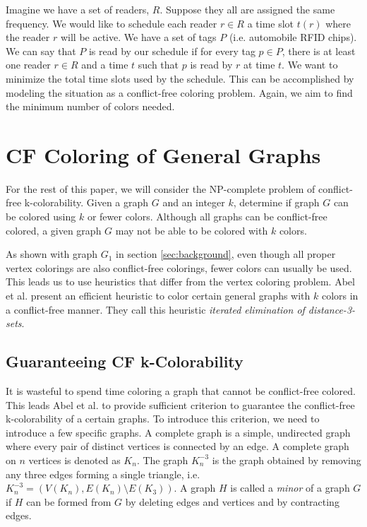 \documentclass{sig-alternate}
\begin{document}
Imagine we have a set of readers, $R$. Suppose they all are assigned the same frequency. We would like to schedule each reader $r \in R$ a time slot $t(r)$ where the reader $r$ will be active. We have a set of tags $P$ (i.e. automobile RFID chips). We can say that $P$ is read by our schedule if for every tag $p \in P$, there is at least one reader $r \in R$ and a time $t$ such that $p$ is read by $r$ at time $t$. We want to minimize the total time slots used by the schedule. This can be accomplished by modeling the situation as a conflict-free coloring problem. Again, we aim to find the minimum number of colors needed. \cite{cheilaris2014strong, smorodinsky2013conflict}

\section{CF Coloring of General Graphs}
For the rest of this paper, we will consider the NP-complete problem of conflict-free k-colorability. Given a graph $G$ and an integer $k$, determine if graph $G$ can be colored using $k$ or fewer colors. Although all graphs can be conflict-free colored, a given graph $G$ may not be able to be colored with $k$ colors.

As shown with graph $G_1$ in section \ref{sec:background}, even though all proper vertex colorings are also conflict-free colorings, fewer colors can usually be used. This leads us to use heuristics that differ from the vertex coloring problem. Abel et al. \cite{abel2017three} present an efficient heuristic to color certain general graphs with $k$ colors in a conflict-free manner. They call this heuristic \emph{iterated elimination of distance-3-sets}.

\subsection{Guaranteeing CF k-Colorability}
It is wasteful to spend time coloring a graph that cannot be conflict-free colored. This leads Abel et al. to provide sufficient criterion to guarantee the conflict-free k-colorability of a certain graphs. To introduce this criterion, we need to introduce a few specific graphs. A complete graph is a simple, undirected graph where every pair of distinct vertices is connected by an edge. A complete graph on $n$ vertices is denoted as $K_n$. The graph $K_n^{-3}$ is the graph obtained by removing any three edges forming a single triangle, i.e. \(K_n^{-3} =  \left ( V(K_n), E(K_n) \setminus E(K_3) \right ) \). A graph $H$ is called a \emph{minor} of a graph $G$ if $H$ can be formed from $G$ by deleting edges and vertices and by contracting edges. \cite{abel2017three,bondy1976graph}
\end{document}
